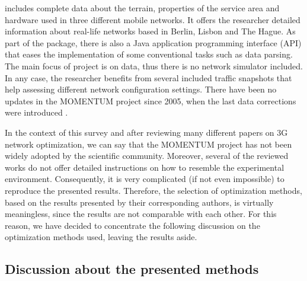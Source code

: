 includes complete data about the terrain, properties of the service
area and hardware used in three different mobile networks. It offers
the researcher detailed information about real-life networks based
in Berlin, Lisbon and The Hague. As part of the package, there is
also a Java application programming interface (API) that eases the
implementation of some conventional tasks such as data parsing. The
main focus of project is on data, thus there is no network simulator
included. In any case, the researcher benefits from several included
traffic snapshots that help assessing different network configuration
settings. There have been no updates in the MOMENTUM project since
2005, when the last data corrections were introduced \cite{Momentum.project}.

In the context of this survey and after reviewing many different papers
on 3G network optimization, we can say that the MOMENTUM project has
not been widely adopted by the scientific community. Moreover, several
of the reviewed works do not offer detailed instructions on how to
resemble the experimental environment. Consequently, it is very complicated
(if not even impossible) to reproduce the presented results. Therefore,
the selection of optimization methods, based on the results presented
by their corresponding authors, is virtually meaningless, since the
results are not comparable with each other. For this reason, we have
decided to concentrate the following discussion on the optimization
methods used, leaving the results aside.


\subsection{Discussion about the presented methods}

